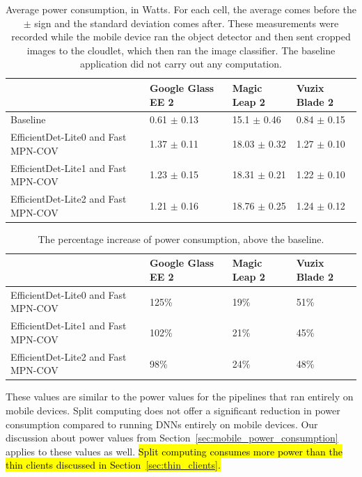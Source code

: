 \begin{table}
\begin{tabular}{|l||l|l|l|}
  \hline
  & Google Glass EE 2 & Magic Leap 2 & Vuzix Blade 2\\
  \hline
  \hline
  Baseline & 0.61 $\pm$ 0.13 & 15.1 $\pm$ 0.46 & 0.84 $\pm$ 0.15\\
  EfficientDet-Lite0 and Fast MPN-COV & 1.37 $\pm$ 0.11 & 18.03 $\pm$ 0.32 & 1.27 $\pm$ 0.10\\
  EfficientDet-Lite1 and Fast MPN-COV & 1.23 $\pm$ 0.15 & 18.31 $\pm$ 0.21 & 1.22 $\pm$ 0.10\\
  EfficientDet-Lite2 and Fast MPN-COV & 1.21 $\pm$ 0.16 & 18.76 $\pm$ 0.25 & 1.24 $\pm$ 0.12\\
  \hline
\end{tabular}
  \caption{
    Average power consumption, in Watts.
    For each cell, the average comes before the $\pm$ sign and the standard
    deviation comes after.
    These measurements were recorded while the mobile device ran the object
    detector and then sent cropped images to the cloudlet, which then ran the
    image classifier.
    The baseline application did not carry out any computation.
  }\label{tab:mobile_power}
\end{table}

\begin{table}
\begin{tabular}{|l||l|l|l|}
  \hline
  & Google Glass EE 2 & Magic Leap 2 & Vuzix Blade 2\\
  \hline
  \hline
  EfficientDet-Lite0 and Fast MPN-COV & 125\% & 19\% & 51\%\\
  EfficientDet-Lite1 and Fast MPN-COV & 102\% & 21\% & 45\%\\
  EfficientDet-Lite2 and Fast MPN-COV & 98\% & 24\% & 48\%\\
  \hline
\end{tabular}
  \caption{
    The percentage increase of power consumption, above the baseline.
  }\label{tab:mobile_power_percentage}
\end{table}

These values are similar to the power values for the pipelines that ran entirely
on mobile devices.
Split computing does not offer a significant reduction in power consumption
compared to running DNNs entirely on mobile devices.
Our discussion about power values from
Section~\ref{sec:mobile_power_consumption} applies to these values as well.
\hl{
  Split computing consumes more power than the thin clients discussed in
  Section~{\ref{sec:thin_clients}}.
}

